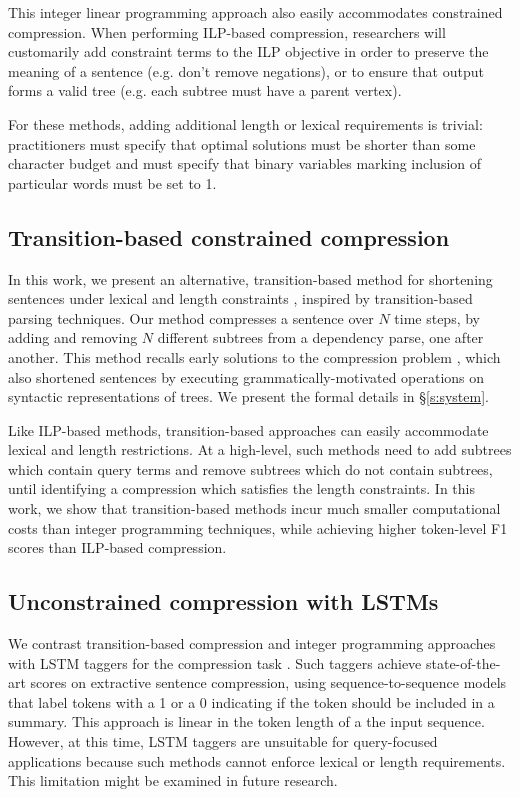 \documentclass[11pt,a4paper]{article}
\begin{document}
This integer linear programming approach also easily accommodates constrained compression. When performing ILP-based compression, researchers will customarily add constraint terms to the ILP objective in order to preserve the meaning of a sentence (e.g. don't remove negations), or to ensure that output forms a valid tree (e.g. each subtree must have a parent vertex).

For these methods, adding additional length or lexical requirements is trivial: practitioners must specify that optimal solutions must be shorter than some character budget and must specify that binary variables marking inclusion of particular words must be set to 1. 

\subsection{Transition-based constrained compression}

In this work, we present an alternative, transition-based method for shortening sentences under lexical and length constraints \cite{Earley1970AnEC,nivre2003}, inspired by transition-based parsing techniques. Our method compresses a sentence over $N$ time steps, by adding and removing $N$ different subtrees from a dependency parse, one after another. This method recalls early solutions to the compression problem \cite{Jing2000SentenceRF,Knight2000StatisticsBasedS}, which also shortened sentences by executing grammatically-motivated operations on syntactic representations of trees. We present the formal details in \S\ref{s:system}.

Like ILP-based methods, transition-based approaches can easily accommodate lexical and length restrictions. At a high-level, such methods need to add subtrees which contain query terms and remove subtrees which do not contain subtrees, until identifying a compression which satisfies the length constraints. In this work, we show that transition-based methods incur much smaller computational costs than integer programming techniques, while achieving higher token-level F1 scores than ILP-based compression.

\subsection{Unconstrained compression with LSTMs}

We contrast transition-based compression and integer programming approaches with LSTM taggers for the compression task \cite{filippova2015sentence}. Such taggers achieve state-of-the-art scores on extractive sentence compression, using sequence-to-sequence models that label tokens with a 1 or a 0 indicating if the token should be included in a summary. This approach is linear in the token length of a the input sequence. However, at this time, LSTM taggers are unsuitable for query-focused applications because such methods cannot enforce lexical or length requirements. This limitation might be examined in future research.
\end{document}
